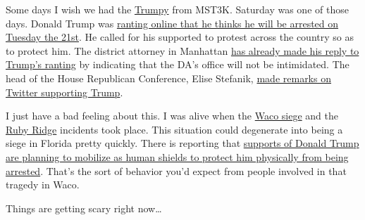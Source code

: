 Some days I wish we had the \href{https://youtu.be/cW-5qrwsiOI}{Trumpy}
from MST3K. Saturday was one of those days. Donald Trump was
\href{https://web.archive.org/web/20230319044058/https://www.reuters.com/article/usa-trump-idCAKBN2VK07I}{ranting
online that he thinks he will be arrested on Tuesday the 21st}. He
called for his supported to protest across the country so as to protect
him. The district attorney in Manhattan
\href{https://web.archive.org/web/20230319042422/https://www.politico.com/news/2023/03/18/manhattan-da-bragg-privately-warns-on-intimidation-threats-to-rule-of-law-00087745}{has
already made his reply to Trump's ranting} by indicating that the DA's
office will not be intimidated. The head of the House Republican
Conference, Elise Stefanik,
\href{https://web.archive.org/web/20230319045107/https://twitter.com/elisestefanik/status/1637126158809538563}{made
remarks on Twitter supporting Trump}.

I just have a bad feeling about this. I was alive when the
\href{https://en.wikipedia.org/w/index.php?title=Waco_siege&oldid=1145378099}{Waco
siege} and the
\href{https://en.wikipedia.org/w/index.php?title=Ruby_Ridge&oldid=1145007827}{Ruby
Ridge} incidents took place. This situation could degenerate into being
a siege in Florida pretty quickly. There is reporting that
\href{https://web.archive.org/web/20230319045658/https://www.thedailybeast.com/officials-prep-for-protests-as-maga-sycophants-push-patriot-moat-around-mar-a-lago}{supports
of Donald Trump are planning to mobilize as human shields to protect him
physically from being arrested}. That's the sort of behavior you'd
expect from people involved in that tragedy in Waco.

Things are getting scary right now\ldots{}
